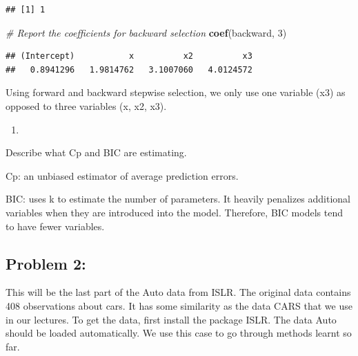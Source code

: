 \documentclass[]{article}
\newenvironment{Shaded}{\begin{snugshade}}{\end{snugshade}}
\newcommand{\KeywordTok}[1]{\textcolor[rgb]{0.13,0.29,0.53}{\textbf{#1}}}
\newcommand{\DecValTok}[1]{\textcolor[rgb]{0.00,0.00,0.81}{#1}}
\newcommand{\StringTok}[1]{\textcolor[rgb]{0.31,0.60,0.02}{#1}}
\newcommand{\CommentTok}[1]{\textcolor[rgb]{0.56,0.35,0.01}{\textit{#1}}}
\newcommand{\OperatorTok}[1]{\textcolor[rgb]{0.81,0.36,0.00}{\textbf{#1}}}
\newcommand{\NormalTok}[1]{#1}
\begin{document}
\begin{Shaded}
\end{Shaded}

\begin{verbatim}
## [1] 1
\end{verbatim}

\begin{Shaded}
\begin{Highlighting}[]
\CommentTok{# Report the coefficients for backward selection}
\KeywordTok{coef}\NormalTok{(backward, }\DecValTok{3}\NormalTok{)}
\end{Highlighting}
\end{Shaded}

\begin{verbatim}
## (Intercept)           x          x2          x3 
##   0.8941296   1.9814762   3.1007060   4.0124572
\end{verbatim}

Using forward and backward stepwise selection, we only use one variable
(x3) as opposed to three variables (x, x2, x3).

\begin{enumerate}
\def\labelenumi{(\alph{enumi})}
\setcounter{enumi}{4}
\item
\end{enumerate}

Describe what Cp and BIC are estimating.

Cp: an unbiased estimator of average prediction errors.

BIC: uses k to estimate the number of parameters. It heavily penalizes
additional variables when they are introduced into the model. Therefore,
BIC models tend to have fewer variables.

\subsection{Problem 2:}\label{problem-2}

This will be the last part of the Auto data from ISLR. The original data
contains 408 observations about cars. It has some similarity as the data
CARS that we use in our lectures. To get the data, first install the
package ISLR. The data Auto should be loaded automatically. We use this
case to go through methods learnt so far.
\end{document}
